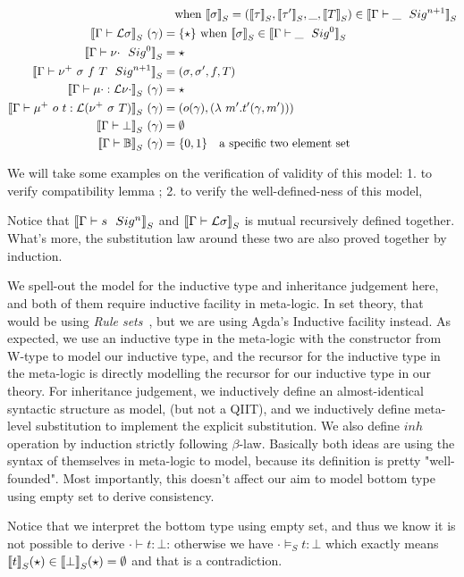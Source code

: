 \begin{align*}
  & \quad \text{when } \denotesS{\sigma} = (\denotesS{\tau}, \denotesS{\tau'}, \_ , \denotesS{T}) \in \denotesS{\goodSig{\Gamma}{\_}{n+1}} \\
  \denotesS{\goodType{\Gamma}{\cL \sigma}{i}} \ (\gamma)&= \{\star\} \text{ when } \denotesS{\sigma} \in \denotesS{\goodSig{\Gamma}{\_}{0}} \\
  \denotesS{\goodSig{\Gamma}{\nu\cdot}{0}} &= \star \\
  \denotesS{\goodSig{\Gamma}{\nu^+ \ \sigma \ f \ T}{n+1}} &= (\sigma, \sigma', f, T) \\
  \denotesS{\goodTerm{\Gamma}{\mu\cdot}{\cL \nu\cdot} } \ (\gamma) &= \star \\
  \denotesS{\goodTerm{\Gamma}{\mu^+ \ o \ t}{\cL(\nu^+ \ \sigma  \ T)}} \ (\gamma)&= (o(\gamma), (\lambda \ m' . t'(\gamma, m'))) \\
  \denotesS{\goodType{\Gamma}{\bot}{i}} \ (\gamma) &= \emptyset \\
  \denotesS{\goodType{\Gamma}{\cB}{i}} \ (\gamma) &= \{0, 1\} \quad \text{a specific two element set} \\
\end{align*}


We will take some examples on the verification of validity of this model: 1. to verify compatibility lemma ; 2. to verify the well-defined-ness of this model,  

Notice that $\denotesS{\goodSig{\Gamma}{s}{n}}$ and $\denotesS{\goodType{\Gamma}{\cL\sigma}{i}}$ is mutual recursively defined together. What's more, the substitution law around these two are also proved together by induction.

We spell-out the model for the inductive type and inheritance judgement here, and both of them require inductive facility in meta-logic. In set theory, that would be using \textit{Rule sets}~\citep{timany2017consistency,aczel1998relating}, but we are using Agda's Inductive facility instead. 
As expected, we use an inductive type in the meta-logic with the constructor from W-type to model our inductive type, and the recursor for the inductive type in the meta-logic is directly modelling the recursor for our inductive type in our theory. For inheritance judgement, we inductively define an almost-identical syntactic structure as model, (but not a QIIT), and we inductively define meta-level substitution to implement the explicit substitution. We also define $inh$ operation by induction strictly following $\beta$-law. Basically both ideas are using the syntax of themselves in meta-logic to model, because its definition is pretty "well-founded". Most importantly, this doesn't affect our aim to model bottom type using empty set to derive consistency.



Notice that we interpret the bottom type using empty set, and thus we know it is not possible to derive $\cdot \vdash t : \bot$: otherwise we have $\cdot \models_S t : \bot$ which exactly means $\denotesS{t}(\star) \in \denotesS{\bot}(\star) = \emptyset$ 
and that is a contradiction.
